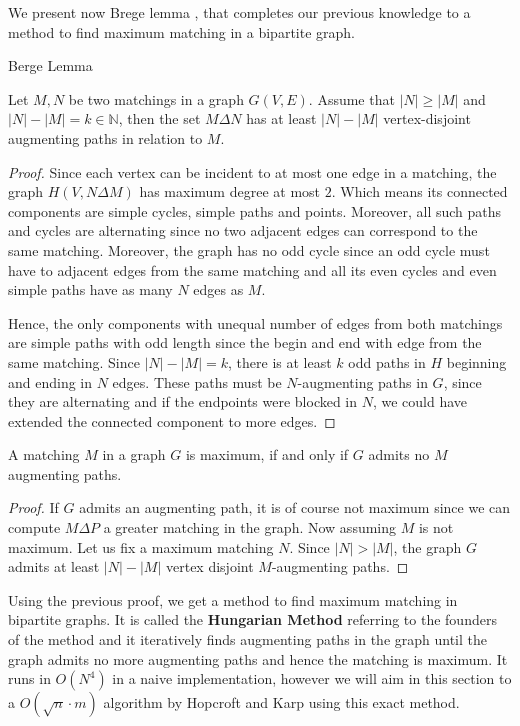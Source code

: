 We present now Brege lemma \cite{berge1957two}, that completes our previous knowledge to a method to find maximum matching in a bipartite graph.
\begin{lemma}Berge Lemma

	Let $M, N$ be two matchings in a graph $G(V, E)$. Assume that $|N| \geq |M|$ and $|N| - |M| = k \in \mathbb{N}$, then the set $M \Delta N$ has at least $|N| - |M|$ vertex-disjoint augmenting paths in relation to $M$.
\end{lemma}
\begin{proof}
	Since each vertex can be incident to at most one edge in a matching, the graph $H(V, N \Delta M)$ has maximum degree at most $2$. Which means its connected components are simple cycles, simple paths and points. Moreover, all such paths and cycles are alternating since no two adjacent edges can correspond to the same matching. Moreover, the graph has no odd cycle since an odd cycle must have to adjacent edges from the same matching and all its even cycles and even simple paths have as many $N$ edges as $M$.

	Hence, the only components with unequal number of edges from both matchings are simple paths with odd length since the begin and end with edge from the same matching. Since $|N| - |M| = k$, there is at least $k$ odd paths in $H$ beginning and ending in $N$ edges. These paths must be $N$-augmenting paths in $G$, since they are alternating and if the endpoints were blocked in $N$, we could have extended the connected component to more edges.
\end{proof}
\begin{corollary}
	A matching $M$ in a graph $G$ is maximum, if and only if $G$ admits no $M$ augmenting paths.
\end{corollary}
\begin{proof}
If $G$ admits an augmenting path, it is of course not maximum since we can compute $M \Delta P$ a greater matching in the graph.
Now assuming $M$ is not maximum. Let us fix a maximum matching $N$. Since $|N| > |M|$, the graph $G$ admits at least $|N| - |M|$ vertex disjoint $M$-augmenting paths.
\end{proof}

Using the previous proof, we get a method to find maximum matching in bipartite graphs. It is called the \textbf{Hungarian Method} referring to the founders of the method and it iteratively finds augmenting paths in the graph until the graph admits no more augmenting paths and hence the matching is maximum. It runs in $O(N^4)$ in a naive implementation, however we will aim in this section to a $O(\sqrt n \cdot m)$ algorithm by Hopcroft and Karp \cite{hopcroft1973n} using this exact method.

